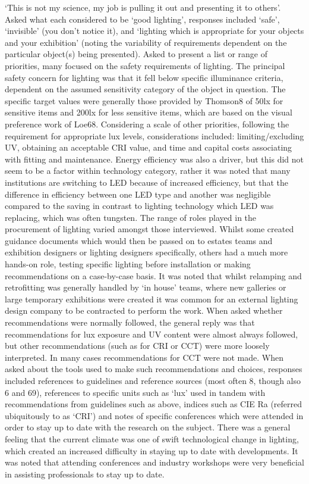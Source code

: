 `This is not my science, my job is pulling it out and presenting it to others'.
Asked what each considered to be `good lighting', responses included `safe', `invisible' (you don't notice it), and `lighting which is appropriate for your objects and your exhibition' (noting the variability of requirements dependent on the particular object(s) being presented). Asked to present a list or range of priorities, many focused on the safety requirements of lighting. The principal safety concern for lighting was that it fell below specific illuminance criteria, dependent on the assumed sensitivity category of the object in question. The specific target values were generally those provided by Thomson8 of 50lx for sensitive items and 200lx for less sensitive items, which are based on the visual preference work of Loe68.
Considering a scale of other priorities, following the requirement for appropriate lux levels, considerations included: limiting/excluding UV, obtaining an acceptable CRI value, and time and capital costs associating with fitting and maintenance. Energy efficiency was also a driver, but this did not seem to be a factor within technology category, rather it was noted that many institutions are switching to LED because of increased efficiency, but that the difference in efficiency between one LED type and another was negligible compared to the saving in contrast to lighting technology which LED was replacing, which was often tungsten.
The range of roles played in the procurement of lighting varied amongst those interviewed. Whilst some created guidance documents which would then be passed on to estates teams and exhibition designers or lighting designers specifically, others had a much more hands-on role, testing specific lighting before installation or making recommendations on a case-by-case basis. It was noted that whilst relamping and retrofitting was generally handled by `in house' teams, where new galleries or large temporary exhibitions were created it was common for an external lighting design company to be contracted to perform the work. When asked whether recommendations were normally followed, the general reply was that recommendations for lux exposure and UV content were almost always followed, but other recommendations (such as for CRI or CCT) were more loosely interpreted. In many cases recommendations for CCT were not made.
When asked about the tools used to make such recommendations and choices, responses included references to guidelines and reference sources (most often 8, though also 6 and 69), references to specific units such as `lux' used in tandem with recommendations from guidelines such as above, indices such as CIE Ra (referred ubiquitously to as `CRI') and notes of specific conferences which were attended in order to stay up to date with the research on the subject. There was a general feeling that the current climate was one of swift technological change in lighting, which created an increased difficulty in staying up to date with developments. It was noted that attending conferences and industry workshops were very beneficial in assisting professionals to stay up to date. 

